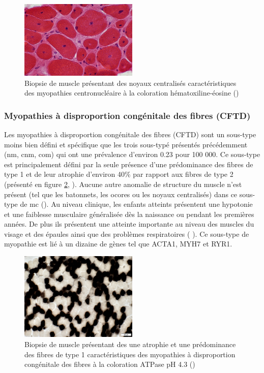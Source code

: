 \begin{figure}[!ht]
 \centering
 \includegraphics[width=0.5\textwidth]{figures/nuc.png}
 \caption[Biopsie de muscle de myopathie centronucléaire.]{Biopsie de muscle présentant des noyaux centralisés caractéristiques des myopathies centronucléaire à la coloration hématoxiline-éosine (\cite{alan_pestronk_neuromuscular_2022})}
 \label{fig:nuc}
\end{figure}

\subsubsection{Myopathies à disproportion congénitale des fibres (CFTD)}
Les myopathies à disproportion congénitale des fibres (CFTD) sont un sous-type moins bien défini et spécifique que les trois sous-typé présentés précédemment (\gls{nm}, \gls{cnm}, \gls{com}) qui ont une prévalence d'environ 0.23 pour 100 000. Ce sous-type est principalement défini par la seule présence d'une prédominance des fibres de type 1 et de leur atrophie d'environ 40\% par rapport aux fibres de type 2 (présenté en figure \ref{fig:cftd}, \cite{claeys_congenital_2020} ). Aucune autre anomalie de structure du muscle n'est présent (tel que les batonnets, les ocores ou les noyaux centralisés) dans ce sous-type de \gls{mc} (\cite{claeys_congenital_2020}). Au niveau clinique, les enfants atteints présentent une hypotonie et une faiblesse musculaire généralisée dès la naissance ou pendant les premières années. De plus ils présentent une atteinte importante au niveau des muscles du visage et des épaules ainsi que des problèmes respiratoires (\cite{claeys_congenital_2020} ). Ce sous-type de myopathie est lié à un dizaine de gènes tel que ACTA1, MYH7 et RYR1.
\begin{figure}[!ht]
 \centering
 \includegraphics[width=0.5\textwidth]{figures/cftd.jpg}
 \caption[Biopsie de muscle de myopathie à disproportion congénitale des fibres]{Biopsie de muscle présentant des une atrophie et une prédominance des fibres de type 1 caractéristiques des myopathies à disproportion congénitale des fibres à la coloration ATPase pH 4.3 (\cite{alan_pestronk_neuromuscular_2022})}
 \label{fig:cftd}
\end{figure}
